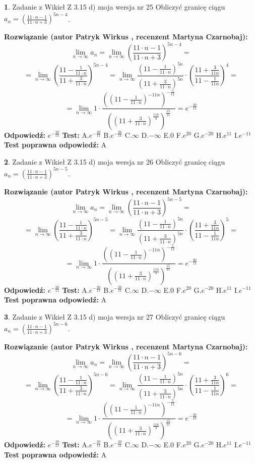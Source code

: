 \documentclass[12pt, a4paper]{article}
\theoremstyle{definition} %
\newtheorem{zad}{}
\newcommand{\zadStart}[1]{\begin{zad}#1\newline}
\newcommand{\zadStop}{\end{zad}}
\newcommand{\rozwStart}[2]{\noindent \textbf{Rozwiązanie (autor #1 , recenzent #2): }\newline}
\newcommand{\rozwStop}{\newline}
\newcommand{\odpStart}{\noindent \textbf{Odpowiedź:}\newline}
\newcommand{\odpStop}{\newline}
\newcommand{\testStart}{\noindent \textbf{Test:}\newline}
\newcommand{\testStop}{\newline}
\newcommand{\kluczStart}{\noindent \textbf{Test poprawna odpowiedź:}\newline}
\newcommand{\kluczStop}{\newline}
\begin{document}
\zadStart{Zadanie z Wikieł Z 3.15 d) moja wersja nr 25}
Obliczyć granicę ciągu $a_{n}=(\frac{11\cdot n - 1}{11 \cdot n + 3})^{5n-4}$.
\zadStop
\rozwStart{Patryk Wirkus}{Martyna Czarnobaj}
$$\lim\limits_{n\to\infty} a_{n} = \lim\limits_{n\to\infty}(\frac{11\cdot n - 1}{11 \cdot n + 3})^{5n-4}=$$
$$=\lim\limits_{n\to\infty}(\frac{11 - \frac{1}{11\cdot n}}{11 + \frac{3}{11 \cdot n}})^{5n-4}=\lim\limits_{n\to\infty}\frac{(11 - \frac{1}{11\cdot n})^{5n}}{(11 + \frac{3}{11\cdot n})^{5n}} \cdot (\frac{11+\frac{3}{11n}}{11-\frac{1}{11n}})^{4}=$$
$$=\lim\limits_{n\to\infty} 1 \cdot \frac{((11-\frac{1}{11 \cdot n})^{-11n})^{-\frac{5}{11}}}{((11+\frac{3}{11 \cdot n})^{\frac{11n}{3}})^{\frac{15}{11}}} =e^{-\frac{20}{11}}$$
\rozwStop
\odpStart
$e^{-\frac{20}{11}}$
\odpStop
\testStart
A.$ e^{-\frac{20}{11}}$
B.$ e^{-\frac{20}{11}}$
C.$\infty$
D.$-\infty$
E.$0$
F.$e^{20}$
G.$e^{-20}$
H.$e^{11}$
I.$e^{-11}$
\testStop
\kluczStart
A
\kluczStop



\zadStart{Zadanie z Wikieł Z 3.15 d) moja wersja nr 26}
Obliczyć granicę ciągu $a_{n}=(\frac{11\cdot n - 1}{11 \cdot n + 3})^{5n-5}$.
\zadStop
\rozwStart{Patryk Wirkus}{Martyna Czarnobaj}
$$\lim\limits_{n\to\infty} a_{n} = \lim\limits_{n\to\infty}(\frac{11\cdot n - 1}{11 \cdot n + 3})^{5n-5}=$$
$$=\lim\limits_{n\to\infty}(\frac{11 - \frac{1}{11\cdot n}}{11 + \frac{3}{11 \cdot n}})^{5n-5}=\lim\limits_{n\to\infty}\frac{(11 - \frac{1}{11\cdot n})^{5n}}{(11 + \frac{3}{11\cdot n})^{5n}} \cdot (\frac{11+\frac{3}{11n}}{11-\frac{1}{11n}})^{5}=$$
$$=\lim\limits_{n\to\infty} 1 \cdot \frac{((11-\frac{1}{11 \cdot n})^{-11n})^{-\frac{5}{11}}}{((11+\frac{3}{11 \cdot n})^{\frac{11n}{3}})^{\frac{15}{11}}} =e^{-\frac{20}{11}}$$
\rozwStop
\odpStart
$e^{-\frac{20}{11}}$
\odpStop
\testStart
A.$ e^{-\frac{20}{11}}$
B.$ e^{-\frac{20}{11}}$
C.$\infty$
D.$-\infty$
E.$0$
F.$e^{20}$
G.$e^{-20}$
H.$e^{11}$
I.$e^{-11}$
\testStop
\kluczStart
A
\kluczStop



\zadStart{Zadanie z Wikieł Z 3.15 d) moja wersja nr 27}
Obliczyć granicę ciągu $a_{n}=(\frac{11\cdot n - 1}{11 \cdot n + 3})^{5n-6}$.
\zadStop
\rozwStart{Patryk Wirkus}{Martyna Czarnobaj}
$$\lim\limits_{n\to\infty} a_{n} = \lim\limits_{n\to\infty}(\frac{11\cdot n - 1}{11 \cdot n + 3})^{5n-6}=$$
$$=\lim\limits_{n\to\infty}(\frac{11 - \frac{1}{11\cdot n}}{11 + \frac{3}{11 \cdot n}})^{5n-6}=\lim\limits_{n\to\infty}\frac{(11 - \frac{1}{11\cdot n})^{5n}}{(11 + \frac{3}{11\cdot n})^{5n}} \cdot (\frac{11+\frac{3}{11n}}{11-\frac{1}{11n}})^{6}=$$
$$=\lim\limits_{n\to\infty} 1 \cdot \frac{((11-\frac{1}{11 \cdot n})^{-11n})^{-\frac{5}{11}}}{((11+\frac{3}{11 \cdot n})^{\frac{11n}{3}})^{\frac{15}{11}}} =e^{-\frac{20}{11}}$$
\rozwStop
\odpStart
$e^{-\frac{20}{11}}$
\odpStop
\testStart
A.$ e^{-\frac{20}{11}}$
B.$ e^{-\frac{20}{11}}$
C.$\infty$
D.$-\infty$
E.$0$
F.$e^{20}$
G.$e^{-20}$
H.$e^{11}$
I.$e^{-11}$
\testStop
\kluczStart
A
\kluczStop
\end{document}
